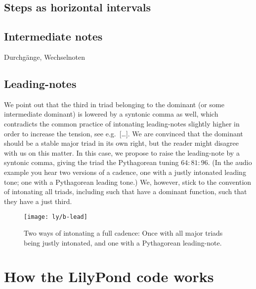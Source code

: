 \documentclass[british,11pt]{scrartcl}
\begin{document}
\subsection{Steps as horizontal intervals}

\subsection{Intermediate notes}

Durchgänge, Wechselnoten

\subsection{Leading-notes}
\label{sec:ln}

We point out that the third in triad belonging to the dominant (or some
intermediate dominant) is lowered by a syntonic comma as well, which contradicts
the common practice of intonating leading-notes slightly higher in order to
increase the tension, see e.g.\ […]. We are convinced that the
dominant should be a stable major triad in its own right, but the reader might
disagree with us on this matter. In this case, we propose to raise the
leading-note by a syntonic comma, giving the triad the Pythagorean tuning
$64:81:96$.  (In the audio example you hear two versions of a cadence, one with
a justly intonated leading tone; one with a Pythagorean leading tone.)  We,
however, stick to the convention of intonating all triads, including such that
have a dominant function, such that they have a just third.

\begin{figure}
  \centering
  \texttt{[image: ly/b-lead]}
  \caption{Two ways of intonating a full cadence: Once with all major triads
    being justly intonated, and one with a Pythagorean leading-note.}\label{fig:lead}
\end{figure}

\appendix

\section{How the LilyPond code works}
\label{sec:ly}
\end{document}
